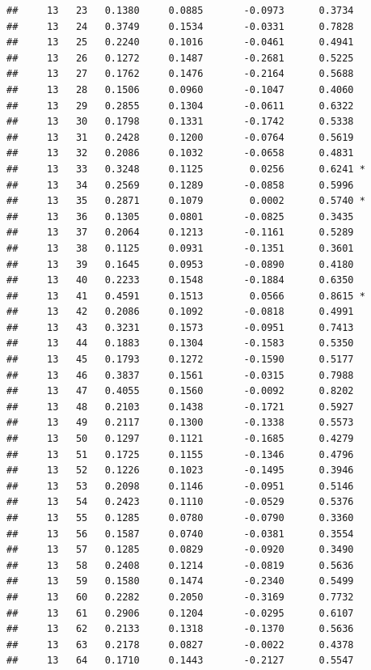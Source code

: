 \documentclass[
]{article}
\begin{document}
\begin{verbatim}
##     13   23   0.1380     0.0885       -0.0973      0.3734  
##     13   24   0.3749     0.1534       -0.0331      0.7828  
##     13   25   0.2240     0.1016       -0.0461      0.4941  
##     13   26   0.1272     0.1487       -0.2681      0.5225  
##     13   27   0.1762     0.1476       -0.2164      0.5688  
##     13   28   0.1506     0.0960       -0.1047      0.4060  
##     13   29   0.2855     0.1304       -0.0611      0.6322  
##     13   30   0.1798     0.1331       -0.1742      0.5338  
##     13   31   0.2428     0.1200       -0.0764      0.5619  
##     13   32   0.2086     0.1032       -0.0658      0.4831  
##     13   33   0.3248     0.1125        0.0256      0.6241 *
##     13   34   0.2569     0.1289       -0.0858      0.5996  
##     13   35   0.2871     0.1079        0.0002      0.5740 *
##     13   36   0.1305     0.0801       -0.0825      0.3435  
##     13   37   0.2064     0.1213       -0.1161      0.5289  
##     13   38   0.1125     0.0931       -0.1351      0.3601  
##     13   39   0.1645     0.0953       -0.0890      0.4180  
##     13   40   0.2233     0.1548       -0.1884      0.6350  
##     13   41   0.4591     0.1513        0.0566      0.8615 *
##     13   42   0.2086     0.1092       -0.0818      0.4991  
##     13   43   0.3231     0.1573       -0.0951      0.7413  
##     13   44   0.1883     0.1304       -0.1583      0.5350  
##     13   45   0.1793     0.1272       -0.1590      0.5177  
##     13   46   0.3837     0.1561       -0.0315      0.7988  
##     13   47   0.4055     0.1560       -0.0092      0.8202  
##     13   48   0.2103     0.1438       -0.1721      0.5927  
##     13   49   0.2117     0.1300       -0.1338      0.5573  
##     13   50   0.1297     0.1121       -0.1685      0.4279  
##     13   51   0.1725     0.1155       -0.1346      0.4796  
##     13   52   0.1226     0.1023       -0.1495      0.3946  
##     13   53   0.2098     0.1146       -0.0951      0.5146  
##     13   54   0.2423     0.1110       -0.0529      0.5376  
##     13   55   0.1285     0.0780       -0.0790      0.3360  
##     13   56   0.1587     0.0740       -0.0381      0.3554  
##     13   57   0.1285     0.0829       -0.0920      0.3490  
##     13   58   0.2408     0.1214       -0.0819      0.5636  
##     13   59   0.1580     0.1474       -0.2340      0.5499  
##     13   60   0.2282     0.2050       -0.3169      0.7732  
##     13   61   0.2906     0.1204       -0.0295      0.6107  
##     13   62   0.2133     0.1318       -0.1370      0.5636  
##     13   63   0.2178     0.0827       -0.0022      0.4378  
##     13   64   0.1710     0.1443       -0.2127      0.5547  

\end{verbatim}
\end{document}
